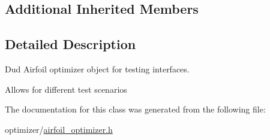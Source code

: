 \subsection*{Additional Inherited Members}


\subsection{Detailed Description}
Dud Airfoil optimizer object for testing interfaces. 

Allows for different test scenarios 

The documentation for this class was generated from the following file\+:\begin{DoxyCompactItemize}
\item 
optimizer/\hyperlink{airfoil__optimizer_8h}{airfoil\+\_\+optimizer.\+h}\end{DoxyCompactItemize}
